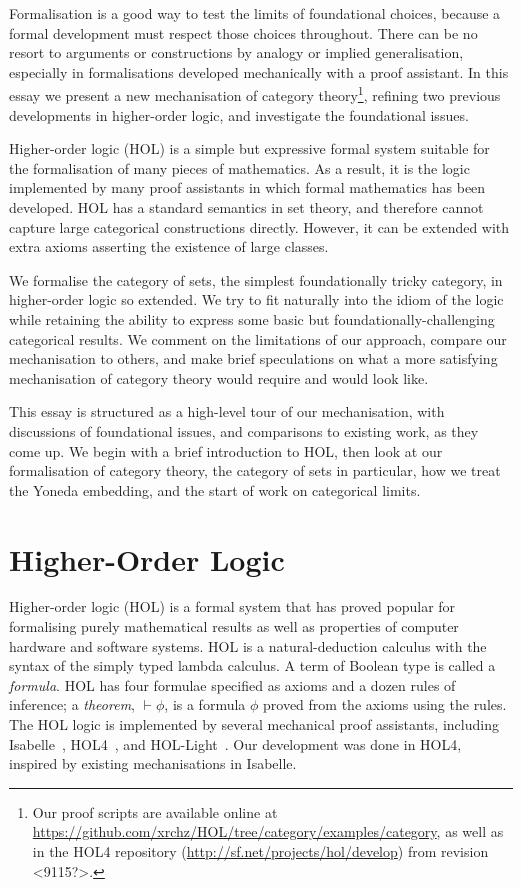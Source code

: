 \documentclass[twoside,titlepage,11pt]{article}
\begin{document}
Formalisation is a good way to test the limits of foundational choices, because a formal development must respect those choices throughout.
There can be no resort to arguments or constructions by analogy or implied generalisation, especially in formalisations developed mechanically with a proof assistant.
In this essay we present a new mechanisation of category theory\footnote{Our proof scripts are available online at \url{https://github.com/xrchz/HOL/tree/category/examples/category}, as well as in the HOL4 repository (\url{http://sf.net/projects/hol/develop}) from revision <9115?>.}, refining two previous developments in higher-order logic, and investigate the foundational issues.

Higher-order logic (HOL) is a simple but expressive formal system suitable for the formalisation of many pieces of mathematics.
As a result, it is the logic implemented by many proof assistants in which formal mathematics has been developed.
HOL has a standard semantics in set theory, and therefore cannot capture large categorical constructions directly.
However, it can be extended with extra axioms asserting the existence of large classes.

We formalise the category of sets, the simplest foundationally tricky category, in higher-order logic so extended.
We try to fit naturally into the idiom of the logic while retaining the ability to express some basic but foundationally-challenging categorical results.
We comment on the limitations of our approach, compare our mechanisation to others, and make brief speculations on what a more satisfying mechanisation of category theory would require and would look like.

This essay is structured as a high-level tour of our mechanisation, with discussions of foundational issues, and comparisons to existing work, as they come up.
We begin with a brief introduction to HOL, then look at our formalisation of category theory, the category of sets in particular, how we treat the Yoneda embedding, and the start of work on categorical limits.
\section{Higher-Order Logic}%
\newcommand{\bool}{\ensuremath{\mathsf{bool}}}
Higher-order logic (HOL) is a formal system that has proved popular for formalising purely mathematical results as well as properties of computer hardware and software systems.
HOL is a natural-deduction calculus with the syntax of the simply typed lambda calculus.
A term of Boolean type is called a \emph{formula}.
HOL has four formulae specified as axioms and a dozen rules of inference; a \emph{theorem}, $\vdash\phi$, is a formula $\phi$ proved from the axioms using the rules.
The HOL logic is implemented by several mechanical proof assistants, including Isabelle~\cite{DBLP:conf/tphol/WenzelPN08}, HOL4~\cite{DBLP:conf/tphol/SlindN08}, and HOL-Light~\cite{DBLP:conf/tphol/Harrison09a}.
Our development was done in HOL4, inspired by existing mechanisations \cite{Katovsky,DBLP:journals/entcs/OKeefe04} in Isabelle.
\end{document}
